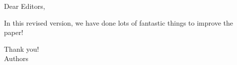 \documentclass[11pt,letterpaper]{article}
\title{}
\author{}
\date{}
\begin{document}
\noindent
Dear Editors, 

In this revised version, we have done lots of fantastic things to improve the paper!

Thank you! \\

Authors
\end{document}

